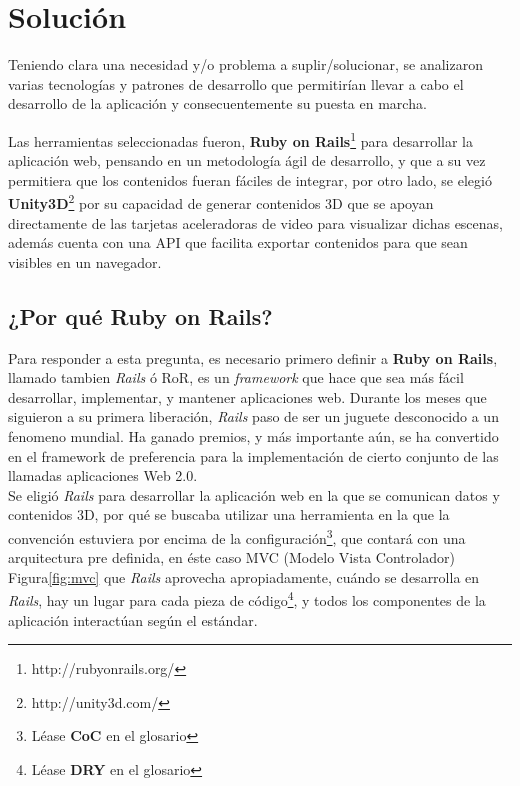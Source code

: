 \chapter{Solución}

Teniendo clara una necesidad y/o problema a suplir/solucionar, se analizaron varias tecnologías y patrones de desarrollo que permitirían llevar a cabo el desarrollo de la aplicación y consecuentemente su puesta en marcha.

Las herramientas seleccionadas fueron, \textbf{Ruby on Rails}\footnote{http://rubyonrails.org/} para desarrollar la aplicación web, pensando en un metodología ágil de desarrollo, y que a su vez permitiera que los contenidos fueran fáciles de integrar, por otro lado, se elegió \textbf{Unity3D}\footnote{http://unity3d.com/} por su capacidad de generar contenidos 3D que se apoyan directamente de las tarjetas aceleradoras de video para visualizar dichas escenas, además cuenta con una API que facilita exportar contenidos para que sean visibles en un navegador.

\section{¿Por qué Ruby on Rails?}

Para responder a esta pregunta, es necesario primero definir a \textbf{Ruby on Rails}, llamado tambien \emph{Rails} ó RoR, es un \emph{framework} que hace que sea más fácil desarrollar, implementar, y mantener aplicaciones web. Durante los meses que siguieron a su primera liberación, \emph{Rails} paso de ser un juguete desconocido a un fenomeno mundial. Ha ganado premios, y más importante aún, se ha convertido en el framework de preferencia para la implementación de cierto conjunto de las llamadas aplicaciones Web 2.0\cite{ror:awdwr}.\\

Se eligió \emph{Rails} para desarrollar la aplicación web en la que se comunican datos y contenidos 3D, por qué se buscaba utilizar una herramienta en la que la convención estuviera por encima de la configuración\footnote{Léase \textbf{CoC} en el glosario}, que contará con una arquitectura pre definida, en éste caso MVC (Modelo Vista Controlador) Figura\ref{fig:mvc} que \emph{Rails} aprovecha apropiadamente, cuándo se desarrolla en \emph{Rails}, hay un lugar para cada pieza de código\footnote{Léase \textbf{DRY} en el glosario}, y todos los componentes de la aplicación interactúan según el estándar.\\

